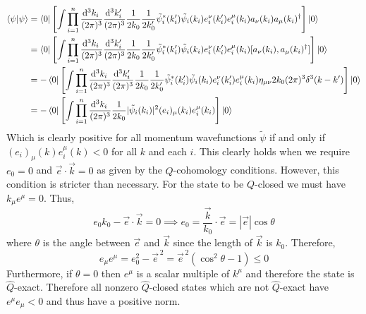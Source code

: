 \documentclass[12pt]{article}
\begin{document}
\begin{align*}
\left< \psi | \psi \right> & = \left< 0 \right| \left[ \int  \prod_{i = 1}^n \frac{\mathrm{d}^{3} k_i \:}{(2 \pi)^3} \frac{\mathrm{d}^{3} k_i' \:}{(2 \pi)^3} \frac{1}{2 k_0} \frac{1}{2 k_0'} \tilde{\psi}^*_i(k_i') \tilde{\psi}_i(k_i) e^\nu_i(k_i') e^\mu_i(k_i) a_\nu(k_i) a_\mu(k_i)^\dagger \right] \left| 0 \right>
\\
& = \left< 0 \right| \left[ \int  \prod_{i = 1}^n \frac{\mathrm{d}^{3} k_i \:}{(2 \pi)^3} \frac{\mathrm{d}^{3} k_i' \:}{(2 \pi)^3} \frac{1}{2 k_0} \frac{1}{2 k_0'}  \tilde{\psi}^*_i(k_i') \tilde{\psi}_i(k_i) e^\nu_i(k_i') e^\mu_i(k_i) [a_\nu(k_i), a_\mu(k_i)^\dagger] \right] \left| 0 \right> 
\\
& = - \left< 0 \right| \left[ \int  \prod_{i = 1}^n \frac{\mathrm{d}^{3} k_i \:}{(2 \pi)^3} \frac{\mathrm{d}^{3} k_i' \:}{(2 \pi)^3} \frac{1}{2 k_0} \frac{1}{2 k_0'}  \tilde{\psi}^*_i(k_i') \tilde{\psi}_i(k_i) e^\nu_i(k_i') e^\mu_i(k_i) \eta_{\mu \nu} 2 k_0 (2 \pi)^3 \delta^3(k - k') \right] \left| 0 \right> 
\\
& = - \left< 0 \right| \left[ \int  \prod_{i = 1}^n \frac{\mathrm{d}^{3} k_i \:}{(2 \pi)^3}  \frac{1}{2 k_0} | \tilde{\psi}_i(k_i) |^2 (e_i)_\mu(k_i) e^\mu_i(k_i) \right] \left| 0 \right> 
\end{align*}  
Which is clearly positive for all momentum wavefunctions $\tilde{\psi}$ if and only if $(e_i)_\mu(k) e_i^\mu(k) < 0$ for all $k$ and each $i$. This clearly holds when we require $e_0 = 0$ and $\vec{e} \cdot \vec{k} = 0$ as given by the $Q$-cohomology conditions. However, this condition is stricter than necessary. For the state to be $Q$-closed we must have $k_\mu e^\mu = 0$. Thus,
\[ e_0 k_0 - \vec{e} \cdot \vec{k} = 0 \implies e_0 = \frac{\vec{k}}{k_0} \cdot \vec{e} = |\vec{e}| \cos{\theta} \]
where $\theta$ is the angle between $\vec{e}$ and $\vec{k}$ since the length of $\vec{k}$ is $k_0$. Therefore,
\[ e_\mu e^\mu = e_0^2 - \vec{e}^{\, 2} = \vec{e}^{\, 2} \left( \cos^2{\theta} - 1 \right) \le 0 \]
Furthermore, if $\theta = 0$ then $e^\mu$ is a scalar multiple of $k^\mu$ and therefore the state is $\hat{Q}$-exact. Therefore all nonzero $\hat{Q}$-closed states which are not $\hat{Q}$-exact have $e^\mu e_\mu < 0$ and thus have a positive norm. 
\end{document}
